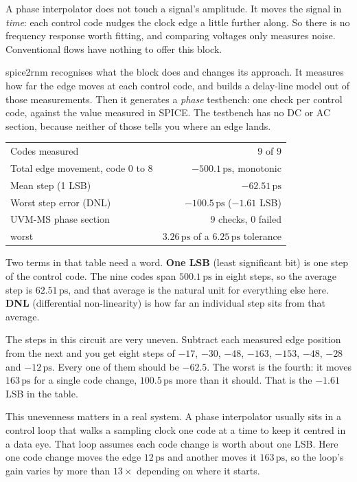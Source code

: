 \documentclass[11pt,a4paper]{article}
\newcommand{\unit}[1]{\,\textrm{#1}}
\begin{document}
A phase interpolator does not touch a signal's amplitude. It moves
the signal in \emph{time}: each control code nudges the clock edge a
little further along. So there is no frequency response worth fitting,
and comparing voltages only measures noise. Conventional flows have
nothing to offer this block.

spice2rnm recognises what the block does and changes its approach. It
measures how far the edge moves at each control code, and builds a
delay-line model out of those measurements. Then it generates a
\emph{phase} testbench: one check per control code, against the value
measured in SPICE. The testbench has no DC or AC section, because
neither of those tells you where an edge lands.

\begin{center}
\begin{tabular}{@{}lr@{}}
\toprule
Codes measured           & $9$ of $9$ \\
Total edge movement, code 0 to 8 & $-500.1\unit{ps}$, monotonic \\
Mean step (1 LSB)        & $-62.51\unit{ps}$ \\
Worst step error (DNL)   & $-100.5\unit{ps}$ \quad ($-1.61$ LSB) \\
\midrule
UVM-MS phase section     & $9$ checks, $0$ failed \\
\quad worst              & $3.26\unit{ps}$ of a $6.25\unit{ps}$ tolerance \\
\bottomrule
\end{tabular}
\end{center}

\noindent Two terms in that table need a word. \textbf{One LSB}
(least significant bit) is one step of the control code. The nine
codes span $500.1\unit{ps}$ in eight steps, so the average step is
$62.51\unit{ps}$, and that average is the natural unit for everything
else here. \textbf{DNL} (differential non-linearity) is how far an
individual step sits from that average.

The steps in this circuit are very uneven. Subtract each measured edge
position from the next and you get eight steps of $-17$, $-30$, $-48$,
$-163$, $-153$, $-48$, $-28$ and $-12\unit{ps}$. Every one of them
should be $-62.5$. The worst is the fourth: it moves $163\unit{ps}$
for a single code change, $100.5\unit{ps}$ more than it should. That
is the $-1.61$ LSB in the table.

This unevenness matters in a real system. A phase interpolator usually
sits in a control loop that walks a sampling clock one code at a time
to keep it centred in a data eye. That loop assumes each code change
is worth about one LSB. Here one code change moves the edge
$12\unit{ps}$ and another moves it $163\unit{ps}$, so the loop's gain
varies by more than $13\times$ depending on where it starts.
\end{document}
